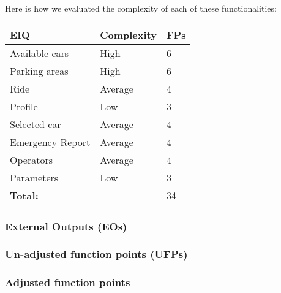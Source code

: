Here is how we evaluated the complexity of each of these functionalities:\\

	\begin{tabular}{|l|l|l|}
		\hline
		\textbf{EIQ} & \textbf{Complexity} & \textbf{FPs}\\ \hline
		Available cars & High & 6\\ \hline
		Parking areas & High & 6\\ \hline
		Ride & Average & 4\\ \hline
		Profile & Low & 3\\ \hline
		Selected car & Average & 4\\ \hline
		Emergency Report & Average & 4\\ \hline
		Operators & Average & 4\\ \hline
		Parameters & Low & 3\\ \hline
		\multicolumn{2}{|l|}{\textbf{Total:}}& 34 \\ \hline
	\end{tabular}



\subsubsection{External Outputs (EOs)}

\subsubsection{Un-adjusted function points (UFPs)}

\subsubsection{Adjusted function points}